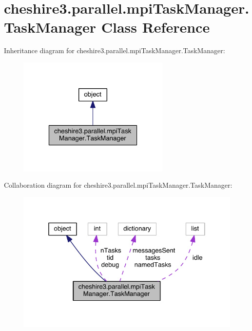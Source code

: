 \hypertarget{classcheshire3_1_1parallel_1_1mpi_task_manager_1_1_task_manager}{\section{cheshire3.\-parallel.\-mpi\-Task\-Manager.\-Task\-Manager Class Reference}
\label{classcheshire3_1_1parallel_1_1mpi_task_manager_1_1_task_manager}
}


Inheritance diagram for cheshire3.\-parallel.\-mpi\-Task\-Manager.\-Task\-Manager\-:
\nopagebreak
\begin{figure}[H]
\begin{center}
\leavevmode
\includegraphics[width=214pt]{classcheshire3_1_1parallel_1_1mpi_task_manager_1_1_task_manager__inherit__graph}
\end{center}
\end{figure}


Collaboration diagram for cheshire3.\-parallel.\-mpi\-Task\-Manager.\-Task\-Manager\-:
\nopagebreak
\begin{figure}[H]
\begin{center}
\leavevmode
\includegraphics[width=321pt]{classcheshire3_1_1parallel_1_1mpi_task_manager_1_1_task_manager__coll__graph}
\end{center}
\end{figure}
